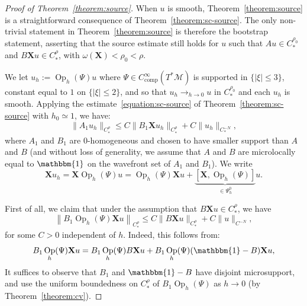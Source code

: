 \documentclass[AHL,Unicode,longabstracts,published]{cedram}
\newcommand{\X}{\mathbf{X}}
\newcommand{\M}{\mathcal{M}}
\newcommand{\comp}{\mathrm{comp}}
\DeclareMathOperator{\Op}{Op}
\begin{document}
\begin{proof}[Proof of Theorem~\ref{theorem:source}]
When $u$ is smooth, Theorem~\ref{theorem:source} is a straightforward consequence of Theorem~\ref{theorem:sc-source}. The only non-trivial statement in Theorem~\ref{theorem:source} is therefore the bootstrap statement, asserting that the source estimate still holds for $u$ such that $Au \in C^{\rho_0}_*$ and $B \X u \in C^\rho_*$, with $\omega(\X) < \rho_0 < \rho$.


We let $u_{h} := \Op_{h}(\Psi)u$ where $\Psi \in C^\infty_{\comp}(T^*\M)$ is supported in $\{|\xi| \leq 3\}$, constant equal to $1$ on $\{|\xi| \leq 2\}$, and so that $u_{h} \to_{h \to 0} u$ in $C^{\rho_0}_*$ and each $u_{h}$ is smooth. Applying the estimate~\eqref{equation:sc-source} of Theorem~\ref{theorem:sc-source} with $h_0 \simeq 1$, we have:
\[
\| A_1 u_{h}\|_{C^\rho_\ast} \leq C \| B_1 \X u_{h} \|_{C^{\rho}_\ast} + C \|u_{h}\|_{C^{-N}_*},
\]
where $A_1$ and $B_1$ are $0$-homogeneous and chosen to have smaller support than $A$ and $B$ (and without loss of generality, we assume that $A$ and $B$ are microlocally equal to $\mathbbm{1}$ on the wavefront set of $A_1$ and $B_1$). We write
\[
\X u_{h} = \X \Op_{h}(\Psi) u = \Op_{h}(\Psi) \X u + \underset{\in \Psi_{h}^0}{\underbrace{\left[\X, \Op_{h}(\Psi)\right]}} u.
\]

First of all, we claim that under the assumption that $B \X u \in C^\rho_*$, we have
\[
\left\|B_1 \Op_{h}(\Psi) \X u\right\|_{C^\rho_*} \leq C \| B \X u\|_{C^\rho_*} + C \| u \|_{C^{-N}},
\]
for some $C > 0$ independent of $h$. Indeed, this follows from:
\[
B_1 \Op_{h}(\Psi) \X u = B_1 \Op_{h}(\Psi) B \X u + B_1 \Op_{h}(\Psi) (\mathbbm{1}-B) \X u,
\]
It suffices to observe that $B_1$ and $\mathbbm{1}-B$ have disjoint microsupport, and use the uniform boundedness on $C^\rho_\ast $ of $B_1 \Op_h(\Psi)$ as $h\to 0$ (by Theorem~\ref{theorem:cv}).


\end{proof}
\end{document}

